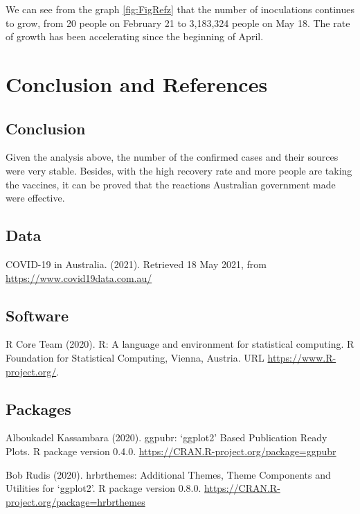 \documentclass[11pt,a4paper,]{article}
\begin{document}
We can see from the graph \ref{fig:FigRefz} that the number of inoculations continues to grow, from 20 people on February 21 to 3,183,324 people on May 18. The rate of growth has been accelerating since the beginning of April.

\hypertarget{conclusion-and-references}{%
\section{Conclusion and References}\label{conclusion-and-references}}

\hypertarget{conclusion}{%
\subsection{Conclusion}\label{conclusion}}

Given the analysis above, the number of the confirmed cases and their sources were very stable. Besides, with the high recovery rate and more people are taking the vaccines, it can be proved that the reactions Australian government made were effective.

\hypertarget{data}{%
\subsection{Data}\label{data}}

COVID-19 in Australia. (2021). Retrieved 18 May 2021, from \url{https://www.covid19data.com.au/}

\hypertarget{software}{%
\subsection{Software}\label{software}}

R Core Team (2020). R: A language and environment for statistical computing. R Foundation for Statistical Computing, Vienna, Austria. URL \url{https://www.R-project.org/}.

\hypertarget{packages}{%
\subsection{Packages}\label{packages}}

Alboukadel Kassambara (2020). ggpubr: `ggplot2' Based Publication Ready Plots. R package version 0.4.0. \url{https://CRAN.R-project.org/package=ggpubr}

Bob Rudis (2020). hrbrthemes: Additional Themes, Theme Components and Utilities for `ggplot2'. R package version 0.8.0. \url{https://CRAN.R-project.org/package=hrbrthemes}
\end{document}
